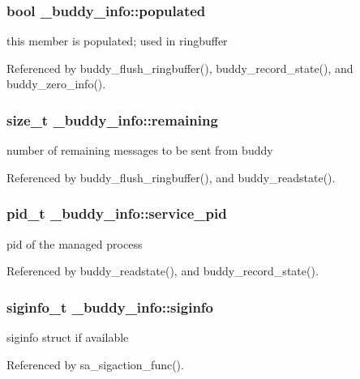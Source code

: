\subsubsection[{populated}]{\setlength{\rightskip}{0pt plus 5cm}bool {\bf \_\-buddy\_\-info::populated}}\label{struct__buddy__info_a916697f2dccd1fc4faf9bcdefcee8e90}
this member is populated; used in ringbuffer 

Referenced by buddy\_\-flush\_\-ringbuffer(), buddy\_\-record\_\-state(), and buddy\_\-zero\_\-info().

\subsubsection[{remaining}]{\setlength{\rightskip}{0pt plus 5cm}size\_\-t {\bf \_\-buddy\_\-info::remaining}}\label{struct__buddy__info_a0e53404c2bbc4000dee7f9e79e384a9b}
number of remaining messages to be sent from buddy 

Referenced by buddy\_\-flush\_\-ringbuffer(), and buddy\_\-readstate().

\subsubsection[{service\_\-pid}]{\setlength{\rightskip}{0pt plus 5cm}pid\_\-t {\bf \_\-buddy\_\-info::service\_\-pid}}\label{struct__buddy__info_ac62c5f536812b863ec3016a7394baaa3}
pid of the managed process 

Referenced by buddy\_\-readstate(), and buddy\_\-record\_\-state().

\subsubsection[{siginfo}]{\setlength{\rightskip}{0pt plus 5cm}siginfo\_\-t {\bf \_\-buddy\_\-info::siginfo}}\label{struct__buddy__info_aad8330ed234bad72bad6a915548519da}
siginfo struct if available 

Referenced by sa\_\-sigaction\_\-func().

